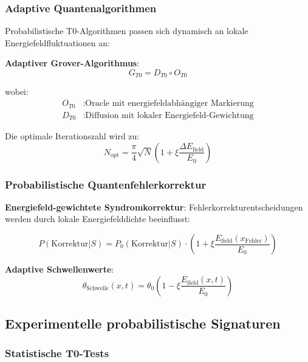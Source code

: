 \documentclass[12pt,a4paper]{article}
\newcommand{\xipar}{\xi}
\theoremstyle{definition}
\theoremstyle{remark}
\begin{document}
\subsubsection{Adaptive Quantenalgorithmen}

Probabilistische T0-Algorithmen passen sich dynamisch an lokale Energiefeldfluktuationen an:

\textbf{Adaptiver Grover-Algorithmus}:
\begin{equation}
	G_{T0} = D_{T0} \circ O_{T0}
\end{equation}

wobei:
\begin{align}
	O_{T0} &: \text{Oracle mit energiefeldabhängiger Markierung} \\
	D_{T0} &: \text{Diffusion mit lokaler Energiefeld-Gewichtung}
\end{align}

Die optimale Iterationszahl wird zu:
\begin{equation}
	N_{\text{opt}} = \frac{\pi}{4} \sqrt{N} \left(1 + \xipar \frac{\Delta E_{\text{field}}}{E_0}\right)
	\label{eq:adaptive_grover_iterations}
\end{equation}

\subsubsection{Probabilistische Quantenfehlerkorrektur}

\textbf{Energiefeld-gewichtete Syndromkorrektur}:
Fehlerkorrekturentscheidungen werden durch lokale Energiefelddichte beeinflusst:

\begin{equation}
	P(\text{Korrektur}|S) = P_0(\text{Korrektur}|S) \cdot \left(1 + \xipar \frac{E_{\text{field}}(x_{\text{Fehler}})}{E_0}\right)
	\label{eq:weighted_error_correction}
\end{equation}

\textbf{Adaptive Schwellenwerte}:
\begin{equation}
	\theta_{\text{Schwelle}}(x,t) = \theta_0 \left(1 - \xipar \frac{E_{\text{field}}(x,t)}{E_0}\right)
	\label{eq:adaptive_threshold}
\end{equation}

\subsection{Experimentelle probabilistische Signaturen}

\subsubsection{Statistische T0-Tests}
\end{document}
